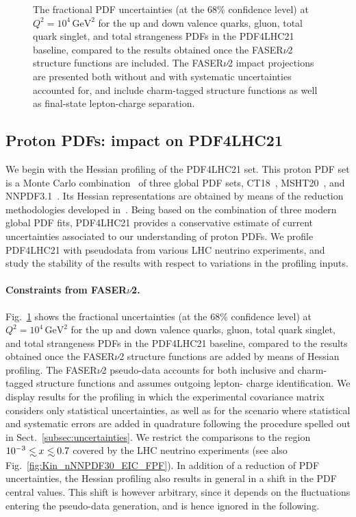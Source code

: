\begin{figure}[t]
\caption{
The fractional PDF uncertainties (at the 68\% confidence level) at $Q^2 = 10^4 \, \textrm{GeV}^2$ 
for the up and down valence quarks, gluon, total quark singlet, and total strangeness PDFs
in the PDF4LHC21 baseline, compared to the results obtained once the FASER$\nu$2 structure
functions are included.
%
The FASER$\nu$2 impact projections are presented both without and with systematic
uncertainties accounted for, and include charm-tagged structure functions
as well as final-state lepton-charge separation.
%
}
\label{fig:FASERnu2_baseline}
\end{figure}

\subsection{Proton PDFs: impact on PDF4LHC21}
\label{sec:pdf4lhc21}

We begin with the Hessian profiling of
the PDF4LHC21 set.
%
This proton PDF set is a Monte Carlo combination~\cite{Watt:2012tq,Carrazza:2015hva} of three global PDF sets, CT18~\cite{Hou:2019efy},
MSHT20~\cite{Bailey:2020ooq}, and NNPDF3.1~\cite{NNPDF:2017mvq}.
%
Its Hessian representations are obtained by means of the reduction methodologies developed in~\cite{Gao:2013bia,Carrazza:2015aoa,Carrazza:2016htc}.
%
Being based on the combination of three modern global PDF fits, PDF4LHC21 provides a conservative estimate
of  current uncertainties associated to our understanding of proton PDFs.
%
We profile PDF4LHC21 with pseudodata from various LHC neutrino experiments,
and study the stability of the results with respect to variations in the profiling inputs.

\paragraph{Constraints from FASER$\nu$2.}
%
Fig.~\ref{fig:FASERnu2_baseline} shows the
fractional uncertainties (at the 68\% confidence level) at $Q^2 = 10^4 \, \textrm{GeV}^2$ 
for the up and down valence quarks, gluon, total quark singlet, and total strangeness PDFs
in the PDF4LHC21 baseline, compared to the results obtained once the FASER$\nu$2 structure functions are
added by means of Hessian profiling.
%
The FASER$\nu$2 pseudo-data accounts for  both  inclusive and charm-tagged structure functions
and assumes outgoing lepton- charge identification.
%
We display results for the profiling in which the experimental covariance matrix
considers only statistical uncertainties, as well as for the scenario where
statistical and systematic errors are added in quadrature following
the procedure spelled out in Sect.~\ref{subsec:uncertainties}.
%
We restrict the comparisons to the region $10^{-3}\lsim x \lsim 0.7$ covered
by the LHC neutrino experiments (see also Fig.~\ref{fig:Kin_nNNPDF30_EIC_FPF}).
%
In addition of a reduction of PDF uncertainties, the Hessian profiling
also results in general in a shift in the PDF central values.
%
This shift is however arbitrary, since it 
depends on the fluctuations
entering the pseudo-data generation, and is hence ignored in the following.

